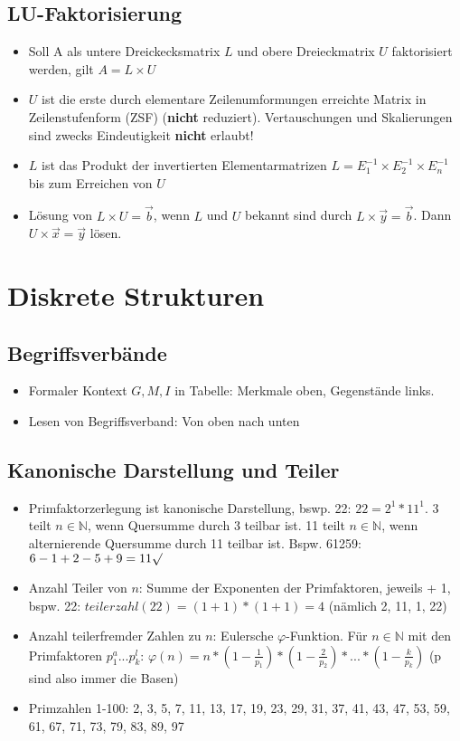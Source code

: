 \documentclass[12pt,landscape]{article}
\begin{document}
\begin{multicols}{3}
\subsection{LU-Faktorisierung}
\begin{itemize}
\item Soll A als untere Dreickecksmatrix $L$ und obere Dreieckmatrix $U$ faktorisiert werden, gilt $A = L \times U$
\item $U$ ist die erste durch elementare Zeilenumformungen erreichte Matrix in Zeilenstufenform (ZSF) (\textbf{nicht} reduziert). Vertauschungen und Skalierungen sind zwecks Eindeutigkeit \textbf{nicht} erlaubt!
\item $L$ ist das Produkt der invertierten Elementarmatrizen $L = E_1^{-1} \times E_2^{-1} \times E_n^{-1}$ bis zum Erreichen von $U$
\item Lösung von $L \times U = \vec{b}$, wenn $L$ und $U$ bekannt sind durch $L \times \vec{y} = \vec{b}$. Dann $U \times \vec{x} = \vec{y}$ lösen.
\end{itemize}
\section{Diskrete Strukturen}
\subsection{Begriffsverbände}
\begin{itemize}
\item Formaler Kontext $G, M, I$ in Tabelle: Merkmale oben, Gegenstände links. 
\item Lesen von Begriffsverband: Von oben nach unten
\end{itemize}
\subsection{Kanonische Darstellung und Teiler}
\begin{itemize}
\item Primfaktorzerlegung ist kanonische Darstellung, bswp. 22: $22 = 2^1 * 11^1$. 3 teilt $n \in \mathbb{N}$, wenn Quersumme durch 3 teilbar ist. 11 teilt $n \in \mathbb{N}$, wenn alternierende Quersumme durch 11 teilbar ist. Bspw. 61259: $6 - 1 + 2 - 5 + 9 = 11 \surd$
\item Anzahl Teiler von $n$: Summe der Exponenten der Primfaktoren, jeweils + 1, bspw. 22: $teilerzahl(22) = (1+1)*(1+1) = 4$ (nämlich 2, 11, 1, 22)
\item Anzahl teilerfremder Zahlen zu $n$: Eulersche $\varphi$-Funktion. Für $n \in \mathbb{N}$ mit den Primfaktoren $p_1^a ... p_k^l$: $\varphi(n)=n*(1-\frac{1}{p_1})*(1-\frac{2}{p_2})*...*(1-\frac{k}{p_k})$ (p sind also immer die Basen)
\item Primzahlen 1-100: 2, 3, 5, 7, 11, 13, 17, 19, 23, 29, 31, 37, 41, 43, 47, 53, 59, 61, 67, 71, 73, 79, 83, 89, 97
\end{itemize}

\end{multicols}
\end{document}
